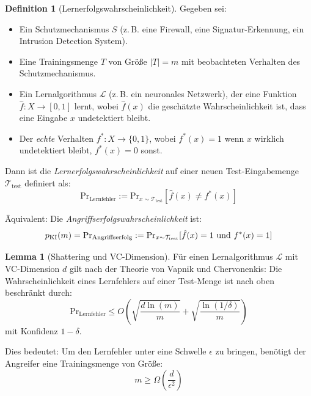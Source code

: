 \documentclass[a4paper,12pt]{article}
\theoremstyle{definition}
\newtheorem{definition}{Definition}
\newtheorem{lemma}{Lemma}
\newcommand{\KI}{\textup{KI}}
\begin{document}
\begin{definition}[Lernerfolgswahrscheinlichkeit]
\label{def:lernwahrscheinlichkeit}
Gegeben sei:
\begin{itemize}
	\item Ein Schutzmechanismus $S$ (z.\,B. eine Firewall, eine Signatur-Erkennung, ein Intrusion Detection System).
	\item Eine Trainingsmenge $T$ von Größe $|T| = m$ mit beobachteten Verhalten des Schutzmechanismus.
	\item Ein Lernalgorithmus $\mathcal{L}$ (z.\,B. ein neuronales Netzwerk), der eine Funktion $\hat{f} : X \to [0,1]$ lernt, wobei $\hat{f}(x)$ die geschätzte Wahrscheinlichkeit ist, dass eine Eingabe $x$ undetektiert bleibt.
	\item Der \emph{echte} Verhalten $f^* : X \to \{0,1\}$, wobei $f^*(x) = 1$ wenn $x$ wirklich undetektiert bleibt, $f^*(x) = 0$ sonst.
\end{itemize}

Dann ist die \emph{Lernerfolgswahrscheinlichkeit} auf einer neuen Test-Eingabemenge $\mathcal{T}_{\mathrm{test}}$ definiert als:
\begin{equation}
\label{eq:lernwahrscheinlichkeit}
\mathrm{Pr}_{\text{Lernfehler}} := \mathrm{Pr}_{x \sim \mathcal{T}_{\mathrm{test}}} [ \hat{f}(x) \neq f^*(x) ]
\end{equation}

Äquivalent: Die \emph{Angriffserfolgswahrscheinlichkeit} ist:
\begin{equation}
p_{\KI}(m) = \mathrm{Pr}_{\text{Angriffserfolg}} := \mathrm{Pr}_{x \sim \mathcal{T}_{\mathrm{test}}} [ \hat{f}(x) = 1 \text{ und } f^*(x) = 1 ]
\end{equation}
\end{definition}

\begin{lemma}[Shattering und VC-Dimension]
\label{lem:vc_dimension}
Für einen Lernalgorithmus $\mathcal{L}$ mit VC-Dimension $d$ gilt nach der Theorie von Vapnik und Chervonenkis: Die Wahrscheinlichkeit eines Lernfehlers auf einer Test-Menge ist nach oben beschränkt durch:
\begin{equation}
\mathrm{Pr}_{\text{Lernfehler}} \leq O\left(\sqrt{\frac{d \ln(m)}{m}} + \sqrt{\frac{\ln(1/\delta)}{m}}\right)
\end{equation}
mit Konfidenz $1-\delta$.

Dies bedeutet: Um den Lernfehler unter eine Schwelle $\epsilon$ zu bringen, benötigt der Angreifer eine Trainingsmenge von Größe:
\begin{equation}
m \geq \Omega\left(\frac{d}{\epsilon^2}\right)
\end{equation}
\end{lemma}
\end{document}
